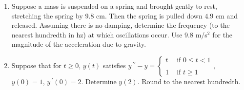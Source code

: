 \documentclass{ximera}
\begin{document}
\begin{enumerate}[label=(\arabic*)]
\item Suppose a mass is suspended on a spring and brought gently to rest, stretching the spring by $9.8$ cm.  Then the spring is pulled down $4.9$ cm and released.  Assuming there is no damping, determine the frequency (to the nearest hundredth in hz) at which oscillations occur.  Use $9.8$ m/s$^{2}$ for the magnitude of the acceleration due to gravity.




\item Suppose that for $t\geq 0$, $y(t)$ satisfies $\displaystyle y\,^{\prime\prime}-y=\left\{\begin{array}{lr}
       t & \mbox{ if }0\leq t<1\\
       \\
       1 &  \mbox{ if }t\geq 1
     \end{array}\right.$, \hspace{0.25cm} $y(0)=1$, $y\,^{\prime}(0)=2$.  Determine $y(2)$.  Round to the nearest hundredth.\\
















\end{enumerate}
\end{document}
